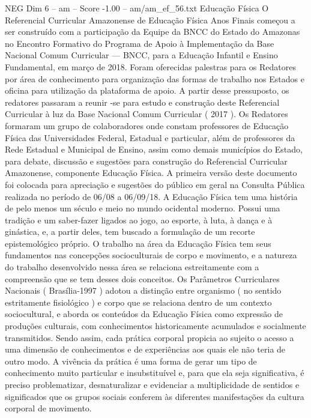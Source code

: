 \begin{textsample}{NEG Dim 6 – am – Score -1.00 – am/am\_ef\_56.txt}  \label{ex:f6_neg_021}
Educação Física O Referencial Curricular Amazonense de Educação Física Anos Finais começou a ser construído com a participação da Equipe da BNCC do Estado do Amazonas no Encontro Formativo do Programa de Apoio à Implementação da Base Nacional Comum Curricular — BNCC, para a Educação Infantil e Ensino Fundamental, em março de 2018.
Foram oferecidas palestras para os Redatores por área de conhecimento para organização das formas de trabalho nos Estados e oficina para utilização da plataforma de apoio.
A partir desse pressuposto, os redatores passaram a reunir -se para estudo e construção deste Referencial Curricular à luz da Base Nacional Comum Curricular ( 2017 ).
Os Redatores formaram um grupo de colaboradores onde constam professores de Educação Física das Universidades Federal, Estadual e particular, além de professores da Rede Estadual e Municipal de Ensino, assim como demais municípios do Estado, para debate, discussão e sugestões para construção do Referencial Curricular Amazonense, componente Educação Física.
A primeira versão deste documento foi colocada para apreciação e sugestões do público em geral na Consulta Pública realizada no período de 06/08 a 06/09/18.
A Educação Física tem uma história de pelo menos um século e meio no mundo ocidental moderno.
Possui uma tradição e um saber-fazer ligados ao jogo, ao esporte, à luta, à dança e à ginástica, e, a partir deles, tem buscado a formulação de um recorte epistemológico próprio.
O trabalho na área da Educação Física tem seus fundamentos nas concepções socioculturais de corpo e movimento, e a natureza do trabalho desenvolvido nessa área se relaciona estreitamente com a compreensão que se tem desses dois conceitos.
Os Parâmetros Curriculares Nacionais ( Brasília-1997 ) adotou a distinção entre organismo ( no sentido estritamente fisiológico ) e corpo que se relaciona dentro de um contexto sociocultural, e aborda os conteúdos da Educação Física como expressão de produções culturais, com conhecimentos historicamente acumulados e socialmente transmitidos.
Sendo assim, cada prática corporal propicia ao sujeito o acesso a uma dimensão de conhecimentos e de experiências aos quais ele não teria de outro modo.
A vivência da prática é uma forma de gerar um tipo de conhecimento muito particular e insubstituível e, para que ela seja significativa, é preciso problematizar, desnaturalizar e evidenciar a multiplicidade de sentidos e significados que os grupos sociais conferem às diferentes manifestações da cultura corporal de movimento.

\end{textsample}
